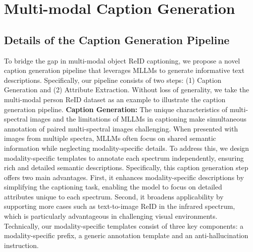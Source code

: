 \section{Multi-modal Caption Generation}
\subsection{Details of the Caption Generation Pipeline}
To bridge the gap in multi-modal object ReID captioning, we propose a novel caption generation pipeline that leverages MLLMs to generate informative text descriptions.
%
Specifically, our pipeline consists of two steps: (1) Caption Generation and (2) Attribute Extraction.
%
Without loss of generality, we take the multi-modal person ReID dataset as an example to illustrate the caption generation pipeline.
%
\textbf{Caption Generation:}
%
The unique characteristics of multi-spectral images and the limitations of MLLMs in captioning make simultaneous annotation of paired multi-spectral images challenging.
%
When presented with images from multiple spectra, MLLMs often focus on shared semantic information while neglecting modality-specific details.
%
To address this, we design modality-specific templates to annotate each spectrum independently, ensuring rich and detailed semantic descriptions.
%
Specifically, this caption generation step offers two main advantages.
%
First, it enhances modality-specific descriptions by simplifying the captioning task, enabling the model to focus on detailed attributes unique to each spectrum.
%
Second, it broadens applicability by supporting more cases such as text-to-image ReID in the infrared spectrum, which is particularly advantageous in challenging visual environments.
%
Technically, our modality-specific templates consist of three key components: a modality-specific prefix, a generic annotation template and an anti-hallucination instruction.
